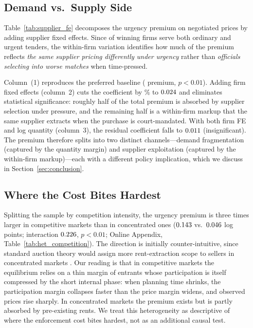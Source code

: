 \subsection{Demand vs.\ Supply Side}
\label{sec:supplier_fe}

Table~\ref{tab:supplier_fe} decomposes the urgency premium on negotiated
prices by adding supplier fixed effects. Since \BPsupFirmsBothShare{} of winning firms
serve both ordinary and urgent tenders, the within-firm variation
identifies how much of the premium reflects \emph{the same supplier
pricing differently under urgency} rather than \emph{officials selecting
into worse matches} when time-pressed.


Column~(1) reproduces the preferred baseline (\BPsupBaselinePct{} premium, $p < 0.01$).
Adding firm fixed effects (column~2) cuts the coefficient by \BPsupFirmFEAttn\% to
$0.024$ and eliminates statistical significance: roughly half of the total
premium is absorbed by supplier selection under pressure, and the
remaining half is a within-firm markup that the same supplier extracts
when the purchase is court-mandated. With both firm FE and log quantity
(column~3), the residual coefficient falls to $0.011$ (insignificant).
The premium therefore splits into two distinct channels---demand
fragmentation (captured by the quantity margin) and supplier exploitation
(captured by the within-firm markup)---each with a different policy
implication, which we discuss in Section~\ref{sec:conclusion}.

\subsection{Where the Cost Bites Hardest}
\label{sec:heterogeneity}

Splitting the sample by competition intensity, the urgency premium is
three times larger in competitive markets than in concentrated ones
($0.143$ vs.\ $0.046$ log points; interaction $0.226$, $p < 0.01$; Online
Appendix, Table~\ref{tab:het_competition}). The direction is initially
counter-intuitive, since standard auction theory would assign more
rent-extraction scope to sellers in concentrated markets
\citep{bulow1996auctions}. Our reading is that in competitive markets
the equilibrium relies on a thin margin of entrants whose participation
is itself compressed by the short internal phase: when planning time
shrinks, the participation margin collapses faster than the price
margin widens, and observed prices rise sharply. In concentrated
markets the premium exists but is partly absorbed by pre-existing
rents. We treat this heterogeneity as descriptive of where the
enforcement cost bites hardest, not as an additional causal test.

